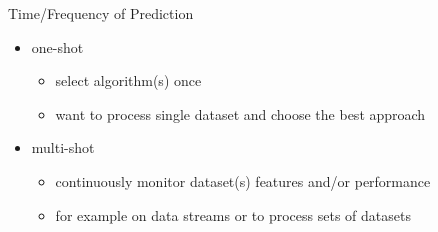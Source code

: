 \begin{frame}[c]{Time/Frequency of Prediction}
\begin{itemize}
\item one-shot
    \begin{itemize}
    \item select algorithm(s) once
    \item want to process single dataset and choose the best approach
    \end{itemize}
\item multi-shot
    \begin{itemize}
    \item continuously monitor dataset(s) features and/or performance
    \item for example on data streams or to process sets of datasets
    \end{itemize}
\end{itemize}
\end{frame}


